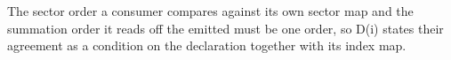 
The sector order a consumer compares against its own sector map and the
summation order it reads off the emitted  must be one order,
so D(i) states their agreement as a condition on the declaration together
with its index map.

